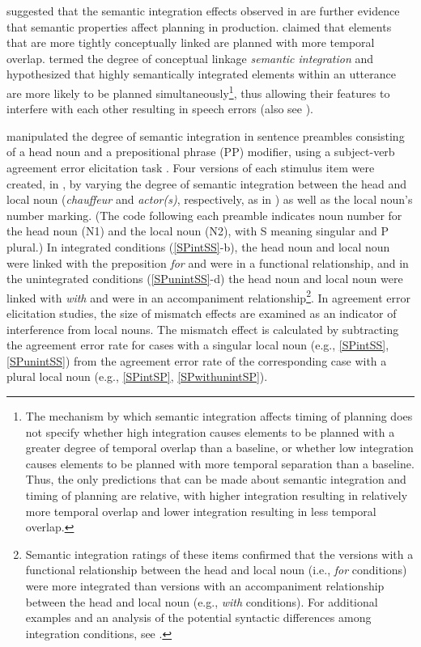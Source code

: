 \documentclass[12pt,titlepage]{article}
\newcommand{\IGNORE}[1]{} %
\begin{document}
 suggested that the semantic integration effects
observed in  are further evidence that
semantic properties affect planning in production.
\citeauthor{SolomonPearlmutter04} claimed that elements that are more
tightly conceptually linked are planned with more temporal
overlap\IGNORE{ during grammatical encoding, increasing their chance
of interfering with each other and resulting in subject-verb agreement
errors}.  \citeauthor{SolomonPearlmutter04} termed the degree of
conceptual linkage \textit{semantic integration} and hypothesized that
highly semantically integrated elements within an utterance are more
likely to be planned simultaneously\footnote{The mechanism by which
semantic integration affects timing of planning does not specify
whether high integration causes elements to be planned with a greater
degree of temporal overlap than a baseline, or whether low integration
causes elements to be planned with more temporal separation than a
baseline.  Thus, the only predictions that can be made about semantic
integration and timing of planning are relative, with higher
integration resulting in relatively more temporal overlap and lower
integration resulting in less temporal overlap.}, thus allowing their
features to interfere with each other resulting in speech errors (also
see ).

 manipulated the degree of semantic
integration in sentence preambles consisting of a head noun and a
prepositional phrase (PP) modifier, using a subject-verb agreement
error elicitation task \cite{BockMiller91}.  Four versions of each
stimulus item were created, in , by varying the degree of
semantic integration between the head and local noun
(\textit{chauffeur} and \textit{actor(s)}, respectively, as in
) as well as the local noun's number marking.  (The code
following each preamble indicates noun number for the head noun (N1)
and the local noun (N2), with S meaning singular and P plural.)  In
integrated conditions (\ref{SPintSS}-b), the head noun and local noun
were linked with the preposition \textit{for} and were in a functional
relationship, and in the unintegrated conditions (\ref{SPunintSS}-d)
the head noun and local noun were linked with \textit{with} and were
in an accompaniment relationship\footnote{Semantic integration ratings
of these items confirmed that the versions with a functional
relationship between the head and local noun (i.e., \textit{for}
conditions) were more integrated than versions with an accompaniment
relationship between the head and local noun (e.g., \textit{with}
conditions).  For additional examples and an analysis of the potential
syntactic differences among integration conditions, see
.}.  In agreement error elicitation
studies, the size of mismatch effects are examined as an indicator of
interference from local nouns.  The mismatch effect is calculated by
subtracting the agreement error rate for cases with a singular local
noun (e.g., \ref{SPintSS}, \ref{SPunintSS}) from the agreement error
rate of the corresponding case with a plural local noun (e.g.,
\ref{SPintSP}, \ref{SPwithunintSP}).
\end{document}
